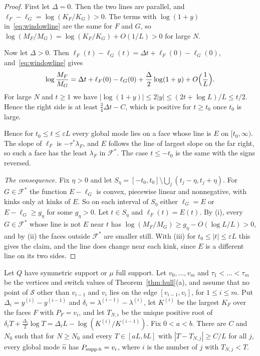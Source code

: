 \begin{proof}
First let $\Delta=0$. Then the two lines are parallel, and $\ell_F-\ell_G=\log(K_F/K_G)>0$. The
terms with $\log(1+y)$ in~\eqref{eq:windowline} are the same for $F$ and $G$, so
$\log(M_F/M_G)=\log(K_F/K_G)+O(1/L)>0$ for large $N$.

Now let $\Delta>0$. Then $\ell_F(t)-\ell_G(t)=\Delta t+\ell_F(0)-\ell_G(0)$,
and~\eqref{eq:windowline} gives
\[
\log\frac{M_F}{M_G}=\Delta t+\ell_F(0)-\ell_G(0)+\frac\Delta2\log(1+y)+O\Bigl(\frac1L\Bigr).
\]
For large $N$ and $t\ge1$ we have $|\log(1+y)|\le2|y|\le(2t+\log L)/L\le t/2$. Hence the right
side is at least $\frac34\Delta t-C$, which is positive for $t\ge t_0$ once $t_0$ is large.

Hence for $t_0\le t\le\varepsilon L$ every global mode lies on a face whose line is $E$ on
$[t_0,\infty)$. The slope of $\ell_F$ is $-\tau^*\lambda_F$, and $E$ follows the line of largest
slope on the far right, so such a face has the least $\lambda_F$ in $\mathcal F^*$. The case
$t\le-t_0$ is the same with the signs reversed.

\emph{The consequence.} Fix $\eta>0$ and let
$S_\eta=[-t_0,t_0]\setminus\bigcup_j(t_j-\eta,t_j+\eta)$. For $G\in\mathcal F^*$ the function
$E-\ell_G$ is convex, piecewise linear and nonnegative, with kinks only at kinks of $E$. So on
each interval of $S_\eta$ either $\ell_G=E$ or $E-\ell_G\ge g_\eta$ for some $g_\eta>0$. Let
$t\in S_\eta$ and $\ell_F(t)=E(t)$. By (i), every $G\in\mathcal F^*$ whose line is not $E$ near
$t$ has $\log(M_F/M_G)\ge g_\eta-O(\log L/L)>0$, and by (ii) the faces outside $\mathcal F^*$
are smaller still. With (iii) for $t_0\le|t|\le\varepsilon L$ this gives the claim, and the line
does change near each kink, since $E$ is a different line on its two sides.
\end{proof}


\begin{corollary}\label{cor:mode-changes}
Let $Q$ have symmetric support or $\mu$ full support. Let $v_0,\dots,v_m$ and
$\tau_1<\dots<\tau_m$ be the vertices and switch values of Theorem~\ref{thm:hull}(a), and
assume that no point of $\mathcal S$ other than $v_{i-1}$ and $v_i$ lies on the edge
$[v_{i-1},v_i]$, for $1\le i\le m$. Put $\Delta_i=y^{(i)}-y^{(i-1)}$ and
$\delta_i=\lambda^{(i-1)}-\lambda^{(i)}$, let $K^{(i)}$ be the largest $K_F$ over the faces
$F$ with $P_F=v_i$, and let $T_{N,i}$ be the unique positive root of
$\delta_iT+\frac{\Delta_i}2\log T=\Delta_iL-\log(K^{(i)}/K^{(i-1)})$. Fix $0<a<b$. There are
$C$ and $N_0$ such that for $N\ge N_0$ and every $T\in[aL,bL]$ with $|T-T_{N,j}|\ge C/L$ for
all $j$, every global mode $\hat n$ has $P_{\operatorname{supp}\hat n}=v_i$, where $i$ is the number of $j$
with $T_{N,j}<T$.
\end{corollary}


